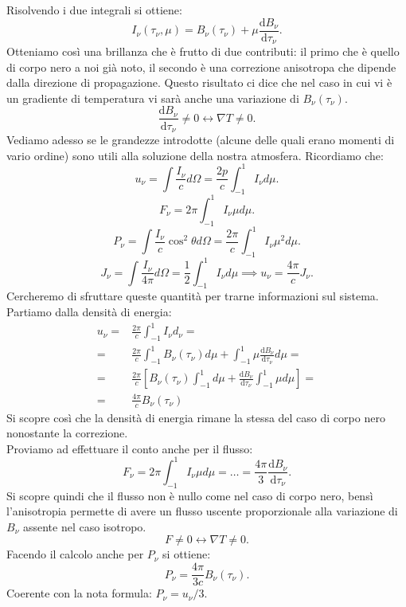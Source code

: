 Risolvendo i due integrali si ottiene:
\[
	I_{\nu} ( \tau _{\nu} , \mu ) = B_{\nu} ( \tau _{\nu} ) + \mu \frac{\mbox{d} B_{\nu} }{\mbox{d} \tau _{\nu} } 
.\] 
Otteniamo così una brillanza che è frutto di due contributi: il primo che è quello di corpo nero a noi già noto, il secondo è una correzione anisotropa che dipende dalla direzione di propagazione.
Questo risultato ci dice che nel caso in cui vi è un gradiente di temperatura vi sarà anche una variazione di $B_{\nu} ( \tau _{\nu} ) $.
\[
	\frac{\mbox{d} B_{\nu} }{\mbox{d} \tau _{\nu} } \neq 0 \leftrightarrow \nabla T \neq 0
.\] 
Vediamo adesso se le grandezze introdotte (alcune delle quali erano momenti di vario ordine) sono utili alla soluzione della nostra atmosfera. Ricordiamo che:
\[
	u_{\nu} = \int \frac{I_{\nu} }{c}d\Omega  = \frac{2p}{c}\int_{-1}^{1} I_{\nu} d\mu  
.\] 
\[
	F_{\nu} = 2\pi \int_{-1}^{1} I_{\nu} \mu d\mu  
.\] 
\[
	P_{\nu} = \int \frac{I_{\nu} }{c}\cos^2\theta d\Omega = \frac{2\pi}{c}\int_{-1}^{1} I_{\nu} \mu ^2d\mu  
.\] 
\[
	J_{\nu} = \int \frac{I_{\nu} }{4\pi}d\Omega = \frac{1}{2}\int_{-1}^{1} I_{\nu} d\mu  \implies u_{\nu} = \frac{4\pi}{c}J_{\nu} 
.\] 
Cercheremo di sfruttare  queste quantità per trarne informazioni sul sistema. Partiamo dalla densità di energia:
\begin{align}
	u_{\nu} =& \frac{2\pi}{c}\int_{-1}^{1} I_{\nu} d_{\nu} =\\
	=& \frac{2\pi}{c}\int_{-1}^{1}B_{\nu} ( \tau _{\nu} )d\mu  + \int_{-1}^{1}\mu \frac{\mbox{d} B_{\nu} }{\mbox{d} \tau _{\nu} } d\mu =\\
	=& \frac{2\pi}{c}\left[ B_{\nu} ( \tau _{\nu} ) \int_{-1}^{1} d\mu + \frac{\mbox{d} B_{\nu} }{\mbox{d} \tau _{\nu} } \int_{-1}^{1} \mu d\mu   \right] =\\
	=& \frac{4\pi}{c}B_{\nu} ( \tau _{\nu} ) 
\end{align}
Si scopre così che la densità di energia rimane la stessa del caso di corpo nero nonostante la correzione.\\
Proviamo ad effettuare il conto anche per il flusso:
\[
	F_{\nu} = 2\pi \int_{-1}^{1} I_{\nu} \mu d\mu = \ldots = \frac{4\pi}{3}\frac{\mbox{d} B_{\nu} }{\mbox{d} \tau _{\nu} } 
.\] 
Si scopre quindi che il flusso non è nullo come nel caso di corpo nero, bensì l'anisotropia permette di avere un flusso uscente proporzionale alla variazione di $B_{\nu} $ assente nel caso isotropo.
\[
	F \neq 0 \leftrightarrow \nabla T \neq 0
.\]
Facendo il calcolo anche per $P_{\nu} $ si ottiene:
\[
	P_{\nu} = \frac{4\pi}{3c}B_{\nu} ( \tau _{\nu} ) 
.\] 
Coerente con la nota formula: $P_{\nu} = u_{\nu} /3$.
